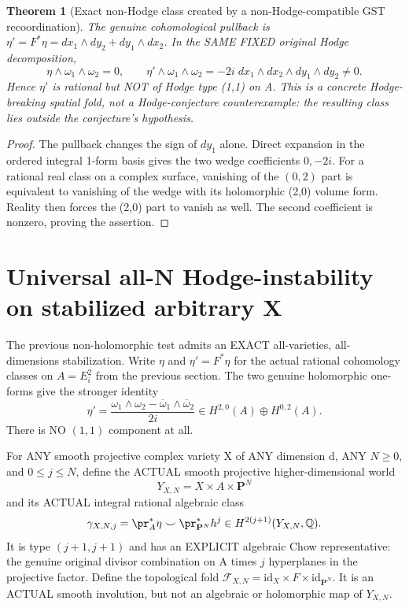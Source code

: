 \documentclass[11pt]{article}
\newcommand{\Q}{\mathbb Q}
\newtheorem{theorem}{Theorem}
\begin{document}
\begin{theorem}[Exact non-Hodge class created by a non-Hodge-compatible GST recoordination]
The genuine cohomological pullback is
\(\eta'=F^*\eta=dx_1\wedge dy_2+dy_1\wedge dx_2\).
In the SAME FIXED original Hodge decomposition,
\[
 \boxed{\eta\wedge\omega_1\wedge\omega_2=0,\qquad
 \eta'\wedge\omega_1\wedge\omega_2
 =-2i\;dx_1\wedge dx_2\wedge dy_1\wedge dy_2\ne0.}
                                                               \tag{5}
\]
Hence \(\eta'\) is rational but NOT of Hodge type (1,1)
on A. This is a concrete Hodge-breaking spatial fold,
not a Hodge-conjecture counterexample: the resulting
class lies outside the conjecture's hypothesis.
\end{theorem}
\begin{proof}
The pullback changes the sign of \(dy_1\) alone.
Direct expansion in the ordered integral 1-form
basis gives the two wedge coefficients \(0,-2i\).
For a rational real class on a complex surface,
vanishing of the \((0,2)\) part is equivalent to
vanishing of the wedge with its holomorphic (2,0)
volume form. Reality then forces the (2,0) part
to vanish as well. The second coefficient is
nonzero, proving the assertion.
\end{proof}

\section{Universal all-N Hodge-instability on stabilized arbitrary X}
The previous
non-holomorphic
test admits an
EXACT all-varieties,
all-dimensions
stabilization.
Write \(\eta\)
and \(\eta'=F^*\eta\)
for the actual
rational cohomology
classes on
\(A=E_i^2\)
from the
previous section.
The two genuine
holomorphic
one-forms
give the
stronger identity
\[
 \boxed{
 \eta'
  =\frac{\omega_1\wedge\omega_2-
       \overline\omega_1\wedge\overline\omega_2}{2i}
   \in H^{2,0}(A)\oplus H^{0,2}(A).
 }                                                        \tag{5a}
\]
There is NO
\((1,1)\) component
at all.

For ANY
smooth projective
complex variety X
of ANY dimension d,
ANY \(N\ge0\),
and \(0\le j\le N\),
define the
ACTUAL smooth
projective
higher-dimensional
world
\[
 Y_{X,N}=X\times A\times\mathbf P^N
\]
and its ACTUAL
integral rational
algebraic class
\[
 \gamma_{X,N,j}
  =\pr_A^*\eta
      \smile\pr_{\mathbf P^N}^*h^j
  \in H^{2(j+1)}(Y_{X,N},\Q).
\]
It is type
\((j+1,j+1)\)
and has an
EXPLICIT
algebraic Chow
representative:
the genuine
original divisor
combination on A
times \(j\)
hyperplanes
in the projective
factor.
Define the
topological
fold
\(
 \mathcal F_{X,N}
 =\mathrm{id}_X\times F\times
       \mathrm{id}_{\mathbf P^N}
\).
It is an
ACTUAL smooth
involution,
but not
an algebraic
or holomorphic
map of
\(Y_{X,N}\).
\end{document}
